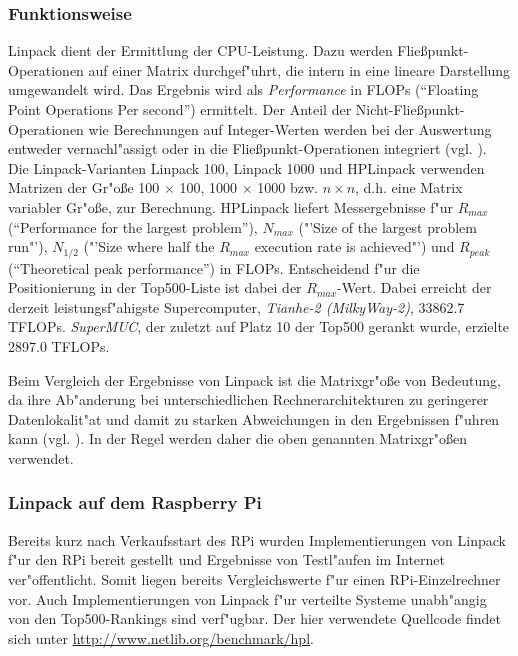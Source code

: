 
\subsubsection{Funktionsweise}\label{Funktion-Linpack}

Linpack dient der Ermittlung der CPU-Leistung. Dazu werden Flie\ss punkt-Operationen auf einer Matrix durchgef"uhrt, die intern in eine lineare Darstellung umgewandelt wird. Das Ergebnis wird als \textit{Performance} in FLOPs ("`Floating Point Operations Per second"') ermittelt. Der Anteil der Nicht-Flie\ss punkt-Operationen wie Berechnungen auf Integer-Werten werden bei der Auswertung entweder vernachl"assigt oder in die Flie\ss punkt-Operationen integriert (vgl. \cite{wei90}). Die Linpack-Varianten Linpack 100, Linpack 1000 und HPLinpack verwenden Matrizen der Gr"o\ss e 100 $\times$ 100, 1000 $\times$ 1000 bzw. $n\times n$, d.h. eine Matrix variabler Gr"o\ss e, zur Berechnung. HPLinpack liefert Messergebnisse f"ur $R_{max}$ ("`Performance for the largest problem"'), $N_{max}$ ("'Size of the largest problem run"'), $N_{1/2}$ ("'Size where half the $R_{max}$ execution rate is achieved"') und $R_{peak}$ ("`Theoretical peak performance"') in FLOPs. Entscheidend f"ur die Positionierung in der Top500-Liste ist dabei der $R_{max}$-Wert. Dabei erreicht der derzeit leistungsf"ahigste Supercomputer, \textit{Tianhe-2 (Milky\-Way-2)}, 33862.7 TFLOPs. \textit{SuperMUC}, der zuletzt auf Platz 10 der Top500 gerankt wurde, erzielte 2897.0 TFLOPs.

Beim Vergleich der Ergebnisse von Linpack ist die Matrixgr"o\ss e von Bedeutung, da ihre Ab"anderung bei unterschiedlichen Rechnerarchitekturen zu geringerer Datenlokalit"at und damit zu starken Abweichungen in den Ergebnissen f"uhren kann (vgl. \cite{wei90}). In der Regel werden daher die oben genannten Matrixgr"o\ss en verwendet. 

\subsubsection{Linpack auf dem Raspberry Pi}\label{Linpack-RPi}

Bereits kurz nach Verkaufsstart des RPi wurden Implementierungen von Linpack f"ur den RPi bereit gestellt und Ergebnisse von Testl"aufen im Internet ver"offentlicht. Somit liegen bereits Vergleichswerte f"ur einen RPi-Einzelrechner vor. Auch Implementierungen von Linpack f"ur verteilte Systeme unabh"angig von den Top500-Rankings sind verf"ugbar. Der hier verwendete Quellcode findet sich unter \url{http://www.netlib.org/benchmark/hpl}. 

